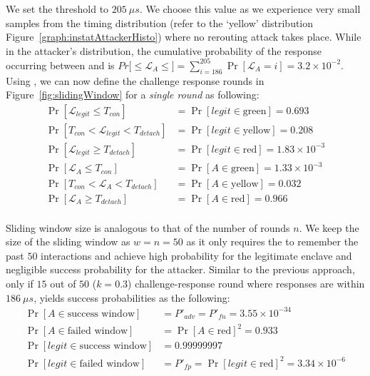  We set the threshold \detach to $205\ \mu s$. We choose this value as we experience very small samples from the timing distribution (refer to the `yellow' distribution Figure~\ref{graph:instatAttackerHisto}) where no rerouting attack takes place. While in the attacker's distribution, the cumulative probability of the response occurring between \connect and \detach is $Pr[$\connect$\leq \mathcal{L}_{A} \leq$\detach$]=\sum_{i=186}^{205}\Pr[\mathcal{L}_{A}=i]=3.2\times10^{-2}$. 
Using \detach, we can now define the challenge response rounds in Figure~\ref{fig:slidingWindow} for a \emph{single round} as following:
%
\begin{align*}
\Pr[\mathcal{L}_{legit}\leq T_{con}]&=\Pr[legit\in\text{green}]=0.693\\
\Pr[T_{con}< \mathcal{L}_{legit}< T_{detach}]&=\Pr[legit\in\text{yellow}]= 0.208\\
\Pr[\mathcal{L}_{legit}\geq T_{detach}]&=\Pr[legit\in\text{red}]= 1.83\times10^{-3}\\
\Pr[\mathcal{L}_{A}\leq T_{con}]&=\Pr[A\in\text{green}]=1.33\times10^{-3}\\
\Pr[T_{con}< \mathcal{L}_{A}< T_{detach}]&=\Pr[A\in\text{yellow}]= 0.032\\
\Pr[\mathcal{L}_{A}\geq T_{detach}]&=\Pr[A\in\text{red}]= 0.966\\
\end{align*} 


 Sliding window size is analogous to that of the number of rounds $n$. We keep  the size of the sliding window as $w=n=50$ as it only requires the \device to remember the past $50$ interactions and achieve high probability for the legitimate enclave and negligible success probability for the attacker. Similar to the previous approach, only if $15$ out of $50$ ($k=0.3$) challenge-response round where responses are within $186\ \mu s$, \name yields success probabilities as the following:
%
\begin{align*}
 \Pr[A \in \text{success window}]&=P'_{adv} = P'_{fn}= 3.55\times 10^{-34}\\
 \Pr[A \in \text{failed window}]&=\Pr[A\in\text{red}]^2=0.933\\
 \Pr[legit \in \text{success window}]&=0.99999997\\
 \Pr[legit \in \text{failed window}]&=P'_{fp}=\Pr[legit\in\text{red}]^2=3.34\times10^{-6}
\end{align*}



